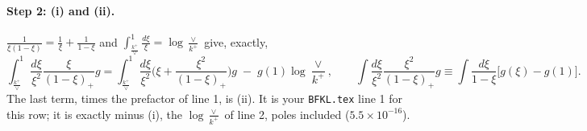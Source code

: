 \documentclass[10pt]{article}
\numberwithin{equation}{section}
\begin{document}
\paragraph{Step 2: (i) and (ii).} $\frac{1}{\xi(1-\xi)}=\frac{1}{\xi}+\frac{1}{1-\xi}$ and $\int_{\frac{k^+}{\vee}}^1\frac{d\xi}{\xi}=\log\frac{\vee}{k^+}$ give, exactly,
\begin{equation}
\int_{\frac{k^+}{\vee}}^1\frac{d\xi}{\xi^2}\frac{\xi}{(1-\xi)_+}g=\int_{\frac{k^+}{\vee}}^1\frac{d\xi}{\xi^2}\Big(\xi+\frac{\xi^2}{(1-\xi)_+}\Big)g\;-\;g(1)\log\frac{\vee}{k^+},\qquad \int\frac{d\xi}{\xi^2}\frac{\xi^2}{(1-\xi)_+}g\equiv\int\frac{d\xi}{1-\xi}\big[g(\xi)-g(1)\big].
\label{eq:I2xi}
\end{equation}
The last term, times the prefactor of line 1, is (ii). It is your \texttt{BFKL.tex} line 1 for this row; it is exactly minus (i), the $\log\frac{\vee}{k^+}$ of line 2, poles included ($5.5\times10^{-16}$).
\end{document}
